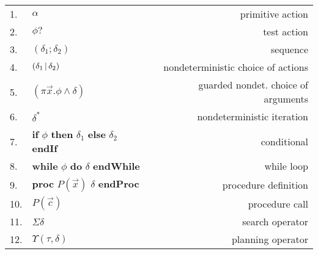 \documentclass[letterpaper]{article}
\begin{document}
\noindent
\begin{tabular}{llr}
1. &\hspace*{-0.3cm}$\alpha$ & \hspace*{-2.3cm} primitive action \\
2. &\hspace*{-0.3cm}$\phi?$  & \hspace*{-2.3cm} test action \\
3. &\hspace*{-0.3cm}$(\delta_1 ; \delta_2)$ & \hspace*{-2.3cm} sequence \\
4. &\hspace*{-0.3cm}$(\delta_1 \thinspace | \thinspace \delta_2)$ & \hspace*{-2.3cm} nondeterministic choice of actions \\
5. &\hspace*{-0.3cm}$(\pi\vec{x}. \phi \wedge \delta)$ & \hspace*{-2.3cm} guarded nondet. choice of arguments \\
6. &\hspace*{-0.3cm}$\delta^*$ & nondeterministic iteration \\
7. &\hspace*{-0.3cm}\textbf{if} $\phi$ \textbf{then} $\delta_1$ \textbf{else} $\delta_2$ {\bf endIf} & conditional \\
8. &\hspace*{-0.3cm}\textbf{while} $\phi$ \textbf{do} $\delta$ {\bf endWhile} & while loop \\
9. &\hspace*{-0.3cm}\textbf{proc} $P(\vec{x})$ $\delta$ {\bf endProc} & procedure definition \\
10. &\hspace*{-0.3cm} $P(\vec{c})$ & procedure call \\
11. & \hspace*{-0.3cm}$\Sigma \delta$ & search operator \\
12. & \hspace*{-0.3cm}$\Upsilon (\tau,\delta)$ & planning operator \\
\end{tabular}
\end{document}
